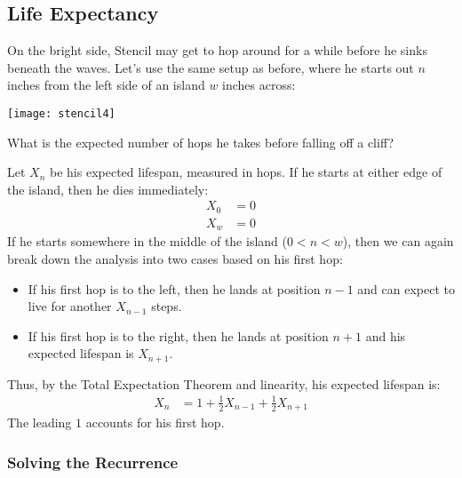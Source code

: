 
\subsection{Life Expectancy}

On the bright side, Stencil may get to hop around for a while before
he sinks beneath the waves.  Let's use the same setup as before, where
he starts out $n$ inches from the left side of an island $w$ inches
across:
%
\begin{center}
\texttt{[image: stencil4]}
\end{center}
%
What is the expected number of hops he takes before falling off a cliff?

Let $X_n$ be his expected lifespan, measured in hops.  If he starts at
either edge of the island, then he dies immediately:
%
\begin{align*}
X_0 & = 0 \\
X_w & = 0
\end{align*}
%
If he starts somewhere in the middle of the island ($0 < n < w$), then
we can again break down the analysis into two cases based on his first
hop:
%
\begin{itemize}

\item If his first hop is to the left, then he lands at position $n-1$
and can expect to live for another $X_{n-1}$ steps.

\item If his first hop is to the right, then he lands at position
$n+1$ and his expected lifespan is $X_{n+1}$.

\end{itemize}
%
Thus, by the Total Expectation Theorem and linearity, his expected
lifespan is:
%
\begin{align*}
X_n & = 1 + \frac{1}{2} X_{n-1} + \frac{1}{2} X_{n+1}
\end{align*}
%
The leading $1$ accounts for his first hop.

\subsubsection*{Solving the Recurrence}

